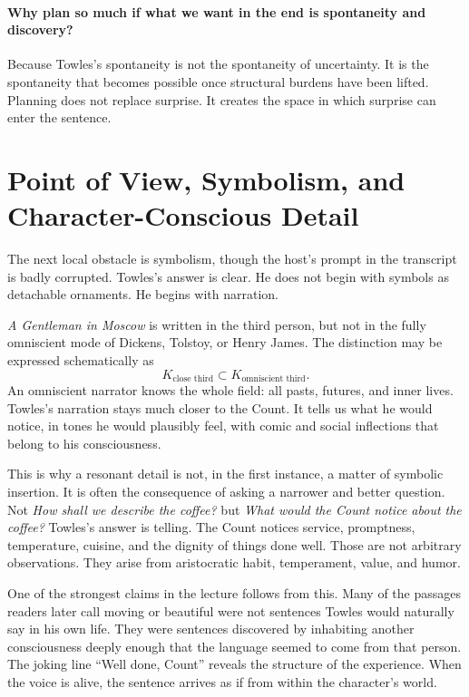 \paragraph{Why plan so much if what we want in the end is spontaneity and discovery?}

Because Towles's spontaneity is not the spontaneity of uncertainty. It is the spontaneity that becomes possible once structural burdens have been lifted. Planning does not replace surprise. It creates the space in which surprise can enter the sentence.

\section{Point of View, Symbolism, and Character-Conscious Detail}

The next local obstacle is symbolism, though the host's prompt in the transcript is badly corrupted. Towles's answer is clear. He does not begin with symbols as detachable ornaments. He begins with narration.

\emph{A Gentleman in Moscow} is written in the third person, but not in the fully omniscient mode of Dickens, Tolstoy, or Henry James. The distinction may be expressed schematically as
\begin{equation}
K_{\text{close third}} \subset K_{\text{omniscient third}}.
\end{equation}
An omniscient narrator knows the whole field: all pasts, futures, and inner lives. Towles's narration stays much closer to the Count. It tells us what he would notice, in tones he would plausibly feel, with comic and social inflections that belong to his consciousness.

This is why a resonant detail is not, in the first instance, a matter of symbolic insertion. It is often the consequence of asking a narrower and better question. Not \emph{How shall we describe the coffee?} but \emph{What would the Count notice about the coffee?} Towles's answer is telling. The Count notices service, promptness, temperature, cuisine, and the dignity of things done well. Those are not arbitrary observations. They arise from aristocratic habit, temperament, value, and humor.

One of the strongest claims in the lecture follows from this. Many of the passages readers later call moving or beautiful were not sentences Towles would naturally say in his own life. They were sentences discovered by inhabiting another consciousness deeply enough that the language seemed to come from that person. The joking line ``Well done, Count'' reveals the structure of the experience. When the voice is alive, the sentence arrives as if from within the character's world.

